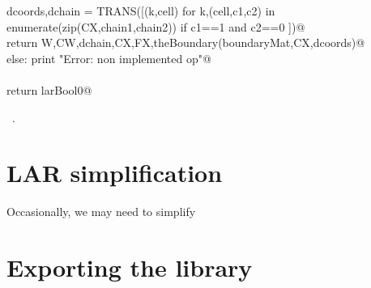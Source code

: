 \documentclass[11pt,oneside]{article}	%
\begin{document}
\begin{flushleft}
\begin{list}{}{}
\mbox{}\verb@         dcoords,dchain = TRANS([(k,cell) for k,(cell,c1,c2) in enumerate(zip(CX,chain1,chain2)) if c1==1 and c2==0 ])@\\
\mbox{}\verb@         return W,CW,dchain,CX,FX,theBoundary(boundaryMat,CX,dcoords)@\\
\mbox{}\verb@      else: print "Error: non implemented op"@\\
\mbox{}\verb@@\\
\mbox{}\verb@   return larBool0@\\
\mbox{}\verb@@{\NWsep}
\end{list}
\vspace{-1ex}
\footnotesize\addtolength{\baselineskip}{-1ex}
\begin{list}{}{\setlength{\itemsep}{-\parsep}\setlength{\itemindent}{-\leftmargin}}
\item \NWtxtMacroRefIn\ .
\end{list}
\end{flushleft}


\section{LAR simplification}

Occasionally, we may need to simplify 

\section{Exporting the library}
\end{document}
